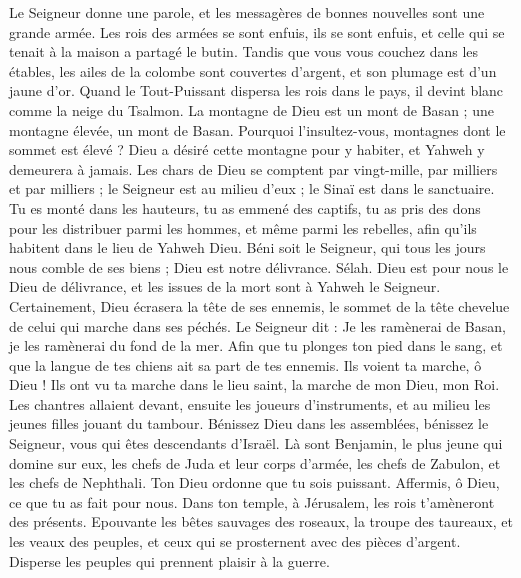 \begin{multicols}{2}
Le Seigneur donne une parole, et les messagères de bonnes nouvelles sont une grande armée.
Les rois des armées se sont enfuis, ils se sont enfuis, et celle qui se tenait à la maison a partagé le butin.
Tandis que vous vous couchez dans les étables, les ailes de la colombe sont couvertes d'argent, et son plumage est d'un jaune d'or.
Quand le Tout-Puissant dispersa les rois dans le pays, il devint blanc comme la neige du Tsalmon.
La montagne de Dieu est un mont de Basan ; une montagne élevée, un mont de Basan.
Pourquoi l'insultez-vous, montagnes dont le sommet est élevé ? Dieu a désiré cette montagne pour y habiter, et Yahweh y demeurera à jamais.
Les chars de Dieu se comptent par vingt-mille, par milliers et par milliers ; le Seigneur est au milieu d'eux ; le Sinaï est dans le sanctuaire.
Tu es monté dans les hauteurs, tu as emmené des captifs, tu as pris des dons pour les distribuer parmi les hommes, et même parmi les rebelles, afin qu'ils habitent dans le lieu de Yahweh Dieu.
Béni soit le Seigneur, qui tous les jours nous comble de ses biens ; Dieu est notre délivrance. Sélah.
Dieu est pour nous le Dieu de délivrance, et les issues de la mort sont à Yahweh le Seigneur.
Certainement, Dieu écrasera la tête de ses ennemis, le sommet de la tête chevelue de celui qui marche dans ses péchés.
Le Seigneur dit : Je les ramènerai de Basan, je les ramènerai du fond de la mer.
Afin que tu plonges ton pied dans le sang, et que la langue de tes chiens ait sa part de tes ennemis.
Ils voient ta marche, ô Dieu ! Ils ont vu ta marche dans le lieu saint, la marche de mon Dieu, mon Roi.
Les chantres allaient devant, ensuite les joueurs d'instruments, et au milieu les jeunes filles jouant du tambour.
Bénissez Dieu dans les assemblées, bénissez le Seigneur, vous qui êtes descendants d'Israël.
Là sont Benjamin, le plus jeune qui domine sur eux, les chefs de Juda et leur corps d'armée, les chefs de Zabulon, et les chefs de Nephthali.
Ton Dieu ordonne que tu sois puissant. Affermis, ô Dieu, ce que tu as fait pour nous.
Dans ton temple, à Jérusalem, les rois t'amèneront des présents.
Epouvante les bêtes sauvages des roseaux, la troupe des taureaux, et les veaux des peuples, et ceux qui se prosternent avec des pièces d'argent. Disperse les peuples qui prennent plaisir à la guerre.

\end{multicols}
